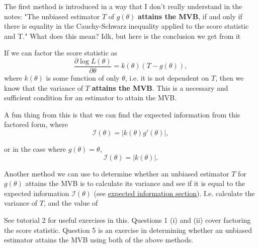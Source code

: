 \bigskip

The first method is introduced in a way that I don't really understand in the notes:
"The unbiased estimator \(T\) of \(g(\theta)\) \textbf{attains the MVB}, if and only if there is equality in the 
Cauchy-Schwarz inequality applied to the score statistic and T."
What does this mean? Idk, but here is the conclusion we get from it

\begin{theorem}\label{thm:factoring score stat}
    If we can factor the score statistic as 
    \begin{equation}\label{eq:factoring score statistic}
        \frac{\partial \log L(\theta)}{\partial \theta} = k(\theta)(T-g(\theta)),
    \end{equation}
    where \(k(\theta)\) is some function of only \(\theta\), i.e. it is not dependent on \(T\), then we know that the variance of \(T\) \textbf{attains the MVB}.
    This is a necessary and sufficient condition for an estimator to attain the MVB. 
\end{theorem}

A fun thing from this is that we can find the expected information from this factored form, where 
\begin{equation}\label{eq:expected info from factored score stat function theta}
    \mathscr{I}(\theta) = |k(\theta)g'(\theta)|,
\end{equation}

or in the case where \(g(\theta)=\theta\), 
\begin{equation}\label{eq:expected info from factored score stat scalar theta}
    \mathscr{I}(\theta) = |k(\theta)|.
\end{equation}


\bigskip

Another method we can use to determine whether an unbiased estimator \(T\) for \(g(\theta)\) attains the MVB is to calculate its variance and see if it is equal to the expected information \(\mathscr{I}(\theta)\) (see \hyperref[defn:expected information - single]{expected information section}). 
I.e. calculate the variance of \(T\), and the value of 

\begin{exercise}
    See tutorial 2 for useful exercises in this. Questions 1 (i) and (ii) cover factoring the score statistic. 
    Question 5 is an exercise in determining whether an unbiased estimator attains the MVB using both of the above methods.  
\end{exercise}





